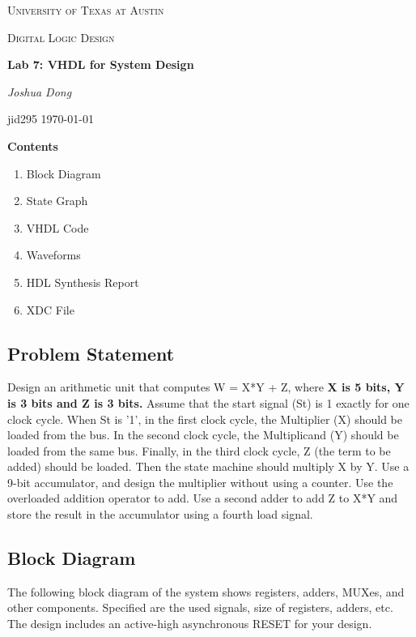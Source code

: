 \documentclass{report}
\begin{document}
\begin{titlepage}
    \centering
    {\scshape\LARGE University of Texas at Austin\par}
    \vspace{1cm}
    {\scshape\Large Digital Logic Design\par}
    \vspace{1.5cm}
    {\huge\bfseries Lab 7: VHDL for System Design\par}
    \vspace{2cm}
    {\Large\itshape Joshua Dong\par}
    jid295
    \vfill
    \today\par
    \vfill
    {\bfseries Contents\par}
    \vspace{0.5cm}
    \begin{varwidth}{\textwidth}
        \begin{enumerate}  
        \item Block Diagram
        \item State Graph
        \item VHDL Code
        \item Waveforms
        \item HDL Synthesis Report
        \item XDC File
        \end{enumerate}
    \end{varwidth}
    \vfill
\end{titlepage}


\subsection{Problem Statement}
Design an arithmetic unit that computes W = X*Y + Z, where {\bfseries X is 5
bits, Y is 3 bits and Z is 3 bits.} Assume that the start signal (St) is 1
exactly for one clock cycle.  When St is '1', in the first clock cycle, the
Multiplier (X) should be loaded from the bus. In the second clock cycle, the
Multiplicand (Y) should be loaded from the same bus. Finally, in the third
clock cycle, Z (the term to be added) should be loaded. Then the state machine
should multiply X by Y. Use a 9-bit accumulator, and design the multiplier
without using a counter. Use the overloaded addition operator to add. Use a
second adder to add Z to X*Y and store the result in the accumulator using a
fourth load signal.


\subsection{Block Diagram}
The following block diagram of the system shows registers, adders, MUXes, and
other components. Specified are the used signals, size of registers, adders,
etc. The design includes an active-high asynchronous RESET for your design.
\end{document}
